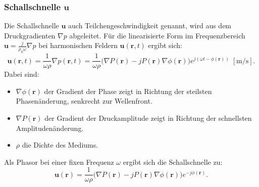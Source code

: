 \subsubsection{Schallschnelle $\boldsymbol{u}$}
% 
Die Schallschnelle $\boldsymbol{u}$ auch Teilchengeschwindigkeit
%
genannt, wird aus dem Druckgradienten $\nabla p$ abgeleitet.
%
Für die linearisierte Form im Frequenzbereich $\boldsymbol{u} =
\frac{j}{\rho_0 \omega} \nabla p$ bei harmonischen Feldern
$\boldsymbol{u}(\boldsymbol{r},t)$ ergibt sich:
\begin{equation}
\boldsymbol{u}(\boldsymbol{r},t)
=
\frac{1}{\omega \rho} \nabla p(\boldsymbol{r},t)
=
\frac{1}{\omega \rho}
\bigl(
\nabla P(\boldsymbol{r}) 
-
jP(\boldsymbol{r})
\nabla\phi(\boldsymbol{r})
\bigr)
e^{j(\omega t -\phi(\boldsymbol{r}))}
\; [\si{\metre / \second}].
\end{equation}
Dabei sind:
\begin{itemize}
\item
$\nabla \phi (\boldsymbol{r})$ der Gradient der Phase zeigt in
Richtung der steilsten Phasenänderung, senkrecht zur Wellenfront.
\item
$\nabla P (\boldsymbol{r})$ der Gradient der Druckamplitude zeigt
in Richtung der schnellsten Amplitudenänderung.
\item
$\rho$ die Dichte des Mediums.
\end{itemize}
Als Phasor bei einer fixen Frequenz $\omega$ ergibt sich die
Schallschnelle zu:
\begin{equation}
\boldsymbol{u}(\boldsymbol{r})
=
\frac{1}{\omega \rho}  \bigl(
\nabla P(\boldsymbol{r})  - j P(\boldsymbol{r}) \nabla\phi(\boldsymbol{r})
\bigr)
e^{-j\phi (\boldsymbol{r})}.
\label{helmholtz:PhasorSchallschnelle}
\end{equation}
 
 
 
 

